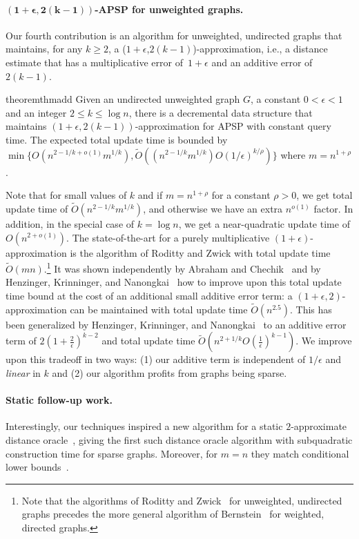\paragraph{$\mathbf{(1+\epsilon, 2(k-1))}$-APSP for unweighted graphs.}Our fourth contribution is an algorithm for unweighted, undirected graphs that maintains, for any $ k \geq 2 $, a ($1 + \epsilon$,$2(k-1)$)-approximation, i.e., a distance estimate that has a multiplicative error of~$ 1 + \epsilon $ and an additive error of~$ 2(k-1) $.
\begin{restatable}{theorem}{thmadd}\label{thm:main_add}
Given an undirected unweighted graph $G$, a constant $0 < \epsilon < 1$ and an integer $2 \leq k \leq \log{n}$, there is a decremental data structure that maintains $(1+\epsilon, 2(k-1))$-approximation for APSP with constant query time. The expected total update time is bounded by $\min\{O(n^{2-1/k+o(1)}m^{1/k}), \tilde{O}((n^{2-1/k}m^{1/k}) O(1/\epsilon)^{k/\rho})\}$ where $m=n^{1+\rho}$.
\end{restatable}

Note that for small values of $k$ and if $m=n^{1+\rho}$ for a constant $\rho>0$, we get total update time of $\tilde{O}(n^{2-1/k}m^{1/k})$, and otherwise we have an extra $n^{o(1)}$ factor. In addition, in the special case of $k=\log{n}$, we get a near-quadratic update time of $O(n^{2+o(1)})$.
The state-of-the-art for a purely multiplicative $ (1 + \epsilon) $-approximation is the algorithm of Roditty and Zwick with total update time $ \tilde O (m n) $.\footnote{Note that the algorithms of Roditty and Zwick~\cite{RZ12} for unweighted, undirected graphs precedes the more general algorithm of Bernstein~\cite{Bernstein16} for weighted, directed graphs.}
It was shown independently by Abraham and Chechik~\cite{AbrahamC13} and by Henzinger, Krinninger, and Nanongkai~\cite{HKN2016} how to improve upon this total update time bound at the cost of an additional small additive error term: a $ (1 + \epsilon, 2) $-approximation can be maintained with total update time $ \tilde O (n^{2.5}) $.
This has been generalized by Henzinger, Krinninger, and Nanongkai~\cite{HKN14} to an additive error term of $ 2 (1 + \tfrac{2}{\epsilon})^{k-2} $ and total update time $ \tilde O (n^{2 + 1/k} O(\tfrac{1}{\epsilon})^{k-1}) $.
We improve upon this tradeoff in two ways: (1) our additive term is independent of $ 1/\epsilon $ and \emph{linear} in $k$ and (2) our algorithm profits from graphs being sparse.

\paragraph{Static follow-up work.} Interestingly, our techniques inspired a new algorithm for a static $2$-approximate distance oracle~\cite{DoryFKNVV23}, giving the first such distance oracle algorithm with subquadratic construction time for sparse graphs. Moreover, for $m=n$ they match conditional lower bounds~\cite{PatrascuRT12, aboud2022stronger}.

